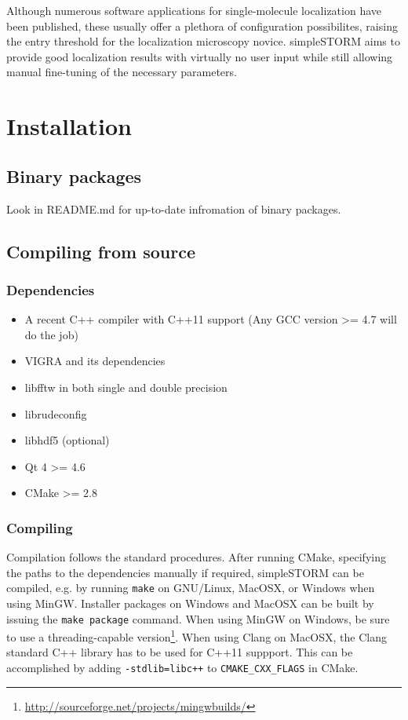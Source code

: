 \documentclass[a4paper,12pt,notitlepage]{report}
\begin{document}
Although numerous software applications for single-molecule localization have been published\citep{pmid23132113, pmid20431545, pmid22522657}, these usually offer a plethora of configuration possibilites, raising the entry threshold for the localization microscopy novice. simpleSTORM aims to provide good localization results with virtually no user input while still allowing manual fine-tuning of the necessary parameters.


\chapter{Installation}

\section{Binary packages}
Look in README.md for up-to-date infromation of binary packages.

\section{Compiling from source}
\subsection{Dependencies}
\begin{itemize}
    \item A recent C++ compiler with C++11 support (Any GCC version >= 4.7 will do the job)
    \item VIGRA and its dependencies
    \item libfftw in both single and double precision
    \item librudeconfig
    \item libhdf5 (optional)
    \item Qt 4 >= 4.6
    \item CMake >= 2.8
\end{itemize}

\subsection{Compiling}
Compilation follows the standard procedures. After running CMake, specifying the paths to the dependencies manually if required, simpleSTORM can be compiled, e.g. by running \texttt{make} on GNU/Linux, MacOSX, or Windows when using MinGW. Installer packages on Windows and MacOSX can be built by issuing the \texttt{make package} command. When using MinGW on Windows, be sure to use a threading-capable version\footnote{\url{http://sourceforge.net/projects/mingwbuilds/}}. When using Clang on MacOSX, the Clang standard C++ library has to be used for C++11 suppport. This can be accomplished by adding \texttt{-stdlib=libc++} to \texttt{CMAKE\_CXX\_FLAGS} in CMake.
\end{document}
